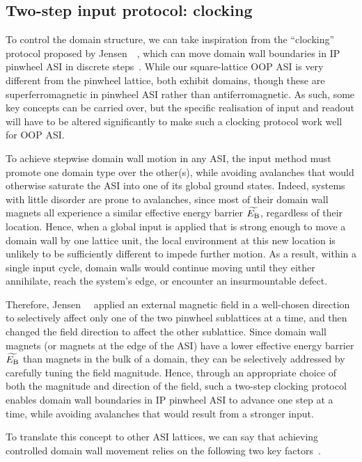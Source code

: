 \subsection{Two-step input protocol: clocking}
To control the domain structure, we can take inspiration from the ``clocking'' protocol proposed by Jensen~\etal~\cite{clocking-protocol}, which can move domain wall boundaries in IP pinwheel ASI in discrete steps~\cite{SnakesInThePlane}.
While our square-lattice OOP ASI is very different from the pinwheel lattice, both exhibit domains, though these are superferromagnetic in pinwheel ASI rather than antiferromagnetic.
As such, some key concepts can be carried over, but the specific realisation of input and readout will have to be altered significantly to make such a clocking protocol work well for OOP ASI. \par
To achieve stepwise domain wall motion in any ASI, the input method must promote one domain type over the other(s), while avoiding avalanches that would otherwise saturate the ASI into one of its global ground states. %
Indeed, systems with little disorder are prone to avalanches, since most of their domain wall magnets all experience a similar effective energy barrier $\widetilde{E_\mathrm{B}}$, regardless of their location.
Hence, when a global input is applied that is strong enough to move a domain wall by one lattice unit, the local environment at this new location is unlikely to be sufficiently different to impede further motion.
As a result, within a single input cycle, domain walls would continue moving until they either annihilate, reach the system's edge, or encounter an insurmountable defect. \par
Therefore, Jensen~\etal~\cite{clocking-protocol} applied an external magnetic field in a well-chosen direction to selectively affect only one of the two pinwheel sublattices at a time, and then changed the field direction to affect the other sublattice.
Since domain wall magnets (or magnets at the edge of the ASI) have a lower effective energy barrier $\widetilde{E_\mathrm{B}}$ than magnets in the bulk of a domain, they can be selectively addressed by carefully tuning the field magnitude.
Hence, through an appropriate choice of both the magnitude and direction of the field, such a two-step clocking protocol enables domain wall boundaries in IP pinwheel ASI to advance one step at a time, while avoiding avalanches that would result from a stronger input. \par
To translate this concept to other ASI lattices, we can say that achieving controlled domain wall movement relies on the following two key factors~\cite{MAES-24}.
